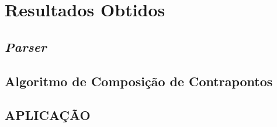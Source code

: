 \chapter[Resultados Obtidos]{Resultados Obtidos}

  \section[\textit{Parser}]{\textit{Parser}}
  \section[Algoritmo de Composição de Contrapontos]{Algoritmo de Composição de Contrapontos}
  \section[APLICAÇÃO]{APLICAÇÃO}
